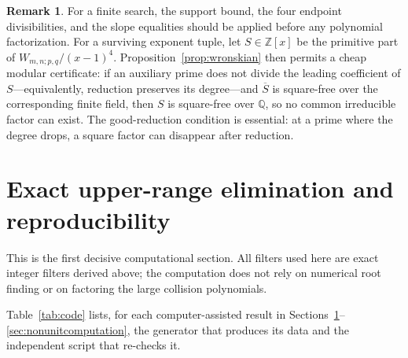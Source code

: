\documentclass[11pt]{article}
\numberwithin{equation}{section}
\theoremstyle{definition}
\newtheorem{remark}[theorem]{Remark}
\newcommand{\Q}{\mathbb Q}
\newcommand{\Z}{\mathbb Z}
\begin{document}
\begin{remark}
For a finite search, the support bound, the four endpoint divisibilities, and
the slope equalities should be applied before any polynomial factorization.
For a surviving exponent tuple, let \(S\in\Z[x]\) be the primitive part of
\(W_{m,n;p,q}/(x-1)^4\).  Proposition~\ref{prop:wronskian} then permits a
cheap modular certificate: if an auxiliary prime does not divide the leading
coefficient of \(S\)---equivalently, reduction preserves its degree---and
\(\overline S\) is square-free over the corresponding finite field, then
\(S\) is square-free over \(\Q\), so no common irreducible factor can exist.
The good-reduction condition is essential: at a prime where the degree drops,
a square factor can disappear after reduction.
\end{remark}


\section{Exact upper-range elimination and reproducibility}
\label{sec:computation}

This is the first decisive computational section.  All filters used here are exact integer filters derived above; the computation does not rely on numerical root finding or on factoring the large collision polynomials.

Table~\ref{tab:code} lists, for each computer-assisted result in
Sections~\ref{sec:computation}--\ref{sec:nonunitcomputation}, the generator
that produces its data and the independent script that re-checks it.
\end{document}
